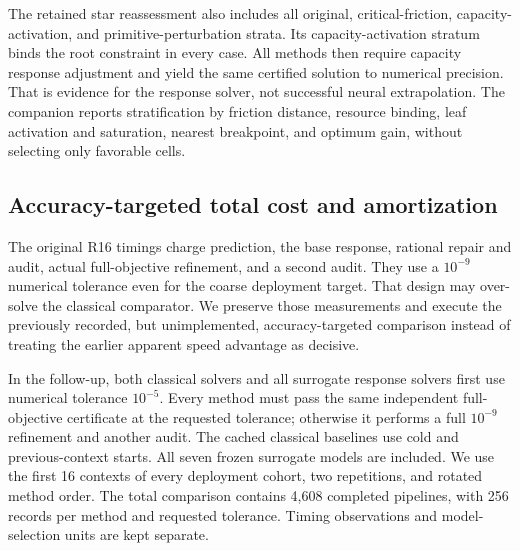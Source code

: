 \documentclass[11pt,letterpaper]{article}
\theoremstyle{definition}
\newcommand{\1}{\mathbf 1}
\begin{document}
The retained star reassessment also includes all original, critical-friction, capacity-activation, and primitive-perturbation strata. Its capacity-activation stratum binds the root constraint in every case. All methods then require capacity response adjustment and yield the same certified solution to numerical precision. That is evidence for the response solver, not successful neural extrapolation. The companion reports stratification by friction distance, resource binding, leaf activation and saturation, nearest breakpoint, and optimum gain, without selecting only favorable cells.

\subsection{Accuracy-targeted total cost and amortization}
The original R16 timings charge prediction, the base response, rational repair and audit, actual full-objective refinement, and a second audit. They use a $10^{-9}$ numerical tolerance even for the coarse deployment target. That design may over-solve the classical comparator. We preserve those measurements and execute the previously recorded, but unimplemented, accuracy-targeted comparison instead of treating the earlier apparent speed advantage as decisive.

In the follow-up, both classical solvers and all surrogate response solvers first use numerical tolerance $10^{-5}$. Every method must pass the same independent full-objective certificate at the requested tolerance; otherwise it performs a full $10^{-9}$ refinement and another audit. The cached classical baselines use cold and previous-context starts. All seven frozen surrogate models are included. We use the first 16 contexts of every deployment cohort, two repetitions, and rotated method order. The total comparison contains 4,608 completed pipelines, with 256 records per method and requested tolerance. Timing observations and model-selection units are kept separate.
\end{document}
